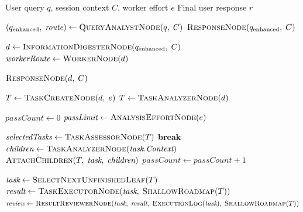 \documentclass{article}
\begin{document}
\begin{algorithm}[t]
\caption{TINYCUA Main Workflow}
\label{alg:tinycua-main-workflow}
\begin{algorithmic}[1]
\Require User query $q$, session context $C$, worker effort $e$
\Ensure Final user response $r$

\State $(q_{\text{enhanced}},\; \textit{route}) \gets \textsc{QueryAnalystNode}(q,\; C)$
    \State \Return $\textsc{ResponseNode}(q_{\text{enhanced}},\; C)$
\EndIf

\State $d \gets \textsc{InformationDigesterNode}(q_{\text{enhanced}},\; C)$
\State $\textit{workerRoute} \gets \textsc{WorkerNode}(d)$

    \State \Return $\textsc{ResponseNode}(d,\; C)$
\EndIf

    \State $T \gets \textsc{TaskCreateNode}(d,\; e)$
    \State $T \gets \textsc{TaskAnalyzerNode}(d)$
\EndIf

\State $\textit{passCount} \gets 0$
\State $\textit{passLimit} \gets \textsc{AnalysisEffortNode}(e)$

    \State $\textit{selectedTasks} \gets \textsc{TaskAssessorNode}(T)$
        \State \textbf{break}
    \EndIf
        \State $\textit{children} \gets \textsc{TaskAnalyzerNode}(\textit{task.Context})$
        \State $\textsc{AttachChildren}(T,\; \textit{task},\; \textit{children})$
    \EndFor
    \State $\textit{passCount} \gets \textit{passCount} + 1$
\EndWhile

    \State $\textit{task} \gets \textsc{SelectNextUnfinishedLeaf}(T)$
    \State $\textit{result} \gets \textsc{TaskExecutorNode}(\textit{task},\; \textsc{ShallowRoadmap}(T))$
    \State $\textit{review} \gets \textsc{ResultReviewerNode}(\textit{task},\; \textit{result},\; \textsc{ExecutionLog}(\textit{task}),\; \textsc{ShallowRoadmap}(T))$


\end{algorithmic}
\end{algorithm}
\end{document}
